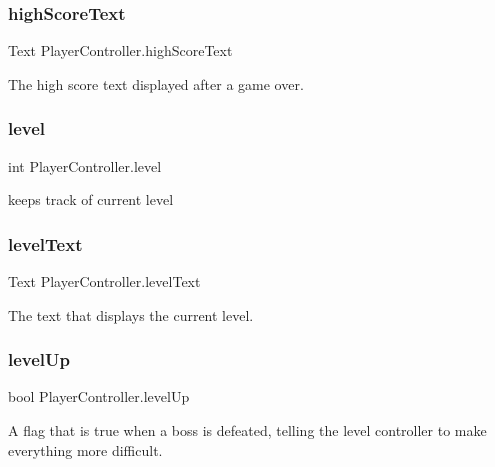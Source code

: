 \subsubsection{\texorpdfstring{highScoreText}{highScoreText}}
{\footnotesize\ttfamily Text Player\+Controller.\+high\+Score\+Text}



The high score text displayed after a game over. 

\mbox{\label{class_player_controller_a72b14fadfbe633bb3ba317b2a59c557e}} 
\subsubsection{\texorpdfstring{level}{level}}
{\footnotesize\ttfamily int Player\+Controller.\+level}



keeps track of current level 

\mbox{\label{class_player_controller_aa9db6bb729491dad366bc5237b2a4b2e}} 
\subsubsection{\texorpdfstring{levelText}{levelText}}
{\footnotesize\ttfamily Text Player\+Controller.\+level\+Text}



The text that displays the current level. 

\mbox{\label{class_player_controller_a40ca018dd43b840f93242df83148ee37}} 
\subsubsection{\texorpdfstring{levelUp}{levelUp}}
{\footnotesize\ttfamily bool Player\+Controller.\+level\+Up}



A flag that is true when a boss is defeated, telling the level controller to make everything more difficult. 

